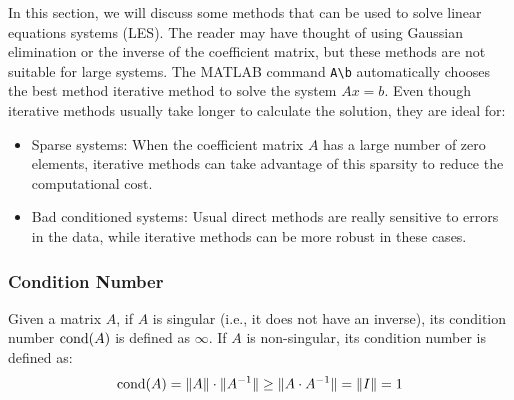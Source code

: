 In this section, we will discuss some methods that can be used to solve linear equations systems (LES). The reader may have thought of using Gaussian elimination or the inverse of the coefficient matrix, but these methods are not suitable for large systems. The MATLAB command \texttt{A\textbackslash b} automatically chooses the best method iterative method to solve the system $Ax=b$. Even though iterative methods usually take longer to calculate the solution, they are ideal for:
\begin{itemize}
    \item Sparse systems: When the coefficient matrix $A$ has a large number of zero elements, iterative methods can take advantage of this sparsity to reduce the computational cost.
    \item Bad conditioned systems: Usual direct methods are really sensitive to errors in the data, while iterative methods can be more robust in these cases.
\end{itemize}

\subsubsection{Condition Number}



Given a matrix $A$, if $A$ is singular (i.e., it does not have an inverse), its condition number $\operatorname{cond}(A)$ is defined as $\infty$. If $A$ is non-singular, its condition number is defined as:
\begin{equation*}
    \operatorname{cond}(A) = \|A\| \cdot \|A^{-1}\|\geq \|A\cdot A^{-1}\| = \|I\| = 1
\end{equation*}

